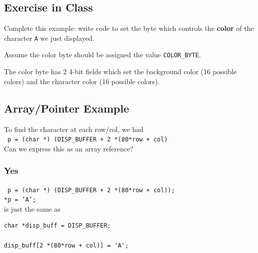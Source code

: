 \subsection{Exercise in Class}
 Complete this example: write code to
 set the byte which controls the {\bf color}
 of the character {\tt A} we just displayed.

 Assume the color byte should be
 assigned the value {\tt COLOR\_BYTE}.

 The color byte has 2 4-bit fields which	%
set the background color (16 possible colors)
and the character color (16 possible colors).


\vspace{2.0in}	%
%
%
%
%
\subsection{Array/Pointer Example}

To find the character at each row/col, we had \\
{\tt
p = (char *) (DISP\_BUFFER + 2 *(80*row + col)} \\
Can we express this as an array reference?

\subsubsection*{Yes}

{\tt
p = (char *) (DISP\_BUFFER + 2 *(80*row + col)); \\
*p = 'A';} \\
is just the same as
\begin{verbatim}
char *disp_buff = DISP_BUFFER;

disp_buff[2 *(80*row + col)] = 'A';
\end{verbatim}

